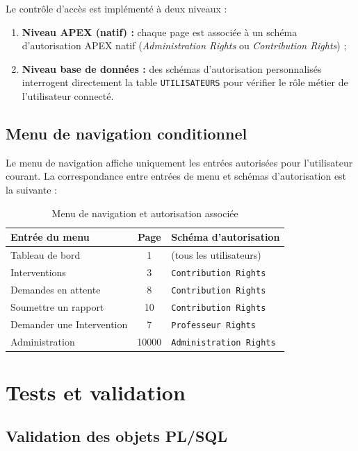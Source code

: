 \documentclass[12pt,a4paper,oneside]{report}
\begin{document}
Le contrôle d'accès est implémenté à deux niveaux :

\begin{enumerate}[leftmargin=2em]
  \item \textbf{Niveau APEX (natif) :} chaque page est associée à un schéma d'autorisation APEX natif (\textit{Administration Rights} ou \textit{Contribution Rights}) ;
  \item \textbf{Niveau base de données :} des schémas d'autorisation personnalisés interrogent directement la table \texttt{UTILISATEURS} pour vérifier le rôle métier de l'utilisateur connecté.
\end{enumerate}

\subsection{Menu de navigation conditionnel}

Le menu de navigation affiche uniquement les entrées autorisées pour l'utilisateur courant. La correspondance entre entrées de menu et schémas d'autorisation est la suivante :

\begin{table}[H]
  \centering
  \caption{Menu de navigation et autorisation associée}
  \begin{tabularx}{\linewidth}{@{}l c X@{}}
    \toprule
    \textbf{Entrée du menu} & \textbf{Page} & \textbf{Schéma d'autorisation} \\
    \midrule
    Tableau de bord & 1 & (tous les utilisateurs) \\
    Interventions & 3 & \texttt{Contribution Rights} \\
    Demandes en attente & 8 & \texttt{Contribution Rights} \\
    Soumettre un rapport & 10 & \texttt{Contribution Rights} \\
    Demander une Intervention & 7 & \texttt{Professeur Rights} \\
    Administration & 10000 & \texttt{Administration Rights} \\
    \bottomrule
  \end{tabularx}
  \label{tab:menu}
\end{table}

\section{Tests et validation}

\subsection{Validation des objets PL/SQL}
\end{document}
